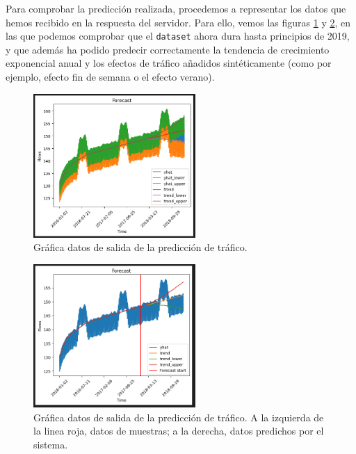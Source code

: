 \documentclass[a4paper, oneside, 12pt]{book}
\begin{document}
	\pagebreak
	
	\noindent Para comprobar la predicción realizada, procedemos a representar los datos que hemos recibido en la respuesta del servidor. Para ello, vemos las figuras \ref{img: graph forecast 1} y \ref{img: graph forecast 2}, en las que podemos comprobar que el \texttt{dataset} ahora dura hasta principios de 2019, y que además ha podido predecir correctamente la tendencia de crecimiento exponencial anual y los efectos de tráfico añadidos sintéticamente (como por ejemplo, efecto fin de semana o el efecto verano). \\
	
	\begin{figure}[h!]
		\begin{center}
			\includegraphics[width=0.55\textwidth]{img/graph_forecast_1.png}
			\caption{Gráfica datos de salida de la predicción de tráfico.}
			\label{img: graph forecast 1}
		\end{center}
	\end{figure}

	\begin{figure}[h!]
		\begin{center}
			\includegraphics[width=0.55\textwidth]{img/graph_forecast_2.png}
			\caption{Gráfica datos de salida de la predicción de tráfico. A la izquierda de la linea roja, datos de muestras; a la derecha, datos predichos por el sistema.}
			\label{img: graph forecast 2}
		\end{center}
	\end{figure}
	
\end{document}
